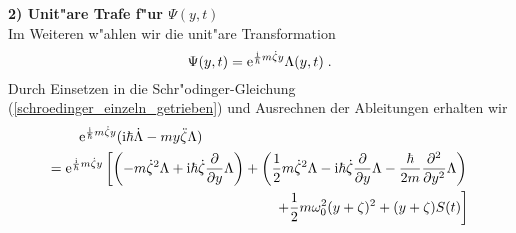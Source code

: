     \textbf{2) Unit"are Trafe f"ur $\Psi(y,t)$}\\
    Im Weiteren w"ahlen wir die unit"are Transformation
    \begin{equation}
      \Psi(y,t) = \text e^{\frac{\text i}{\hbar}m\dot \zeta y}\Lambda(y,t) \; .
    \end{equation}
    Durch Einsetzen in die Schr"odinger-Gleichung (\ref{schroedinger_einzeln_getrieben}) und Ausrechnen der Ableitungen erhalten wir
    \begin{align}
      \begin{split}
        \text e^{\frac{\text i}{\hbar}m\dot \zeta y}(\text i \hbar \dot \Lambda - my \ddot{\zeta}\Lambda)  \quad \quad \quad \quad \quad \quad \quad \quad \quad\quad\quad\quad\quad \quad \quad \quad\quad\quad\quad\\
         = \text e^{\frac{\text i}{\hbar}m\dot \zeta y} \left[\left(-m\dot \zeta^2 \Lambda + \text i \hbar \dot \zeta \frac{\partial}{\partial y} \Lambda \right) + \left(\frac{1}{2}m\dot \zeta^2 \Lambda - \text{i} \hbar \dot \zeta \frac{\partial}{\partial y} \Lambda - \frac{\hbar}{2m}\frac{\partial^2}{\partial y^2} \Lambda  \right) \right. \\
        \left. + \frac{1}{2}m\omega_0^2(y+\zeta)^2  + (y+\zeta)S(t)  \right]
      \end{split}
    \end{align}
    \iffalse
    Durch Einsetzen in die Schr"odinger-Gleichung und Ausrechnen der Ableitungen erhalten wir f"ur die linke Seite von (\ref{schroedinger_einzeln_getrieben})
    \text e^{\frac{\text i}{\hbar}m\dot \zeta y}(\text i \hbar \dot \Lambda - my \ddot{\zeta}\Lambda)
    \begin{equation}
    \end{equation}
    und f"ur die rechte Seite
    \begin{align}
      \begin{split}
      \text e^{\frac{\text i}{\hbar}m\dot \zeta y} \left[\left(-m\dot \zeta^2 \Lambda + \text i \hbar \dot \zeta \frac{\partial}{\partial y} \Lambda \right) + \left(\frac{1}{2}m\dot \zeta^2 \Lambda - \text{i} \hbar \dot \zeta \frac{\partial}{\partial y} \Lambda - \frac{\hbar}{2m}\frac{\partial^2}{\partial y^2} \Lambda  \right) \right. \\
      \left. + \left(\frac{1}{2}m\omega_0^2y^2\Lambda + m\omega_0^2y\zeta\Lambda + \frac{1}{2}m\omega_0^2 \zeta^2\Lambda) \right) + \left(-yS(t)\Lambda - \zeta S(t)\Lambda \right) \right]
    \end{split}
    \end{align}
    \fi

